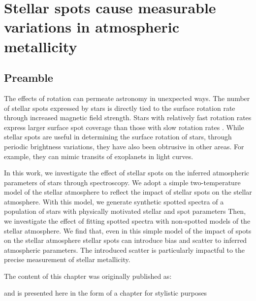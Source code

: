 
\chapter{Stellar spots cause measurable variations in atmospheric metallicity}
\label{chap:stellar_spots}

\section*{Preamble}

The effects of rotation can permeate astronomy in unexpected ways.
The number of stellar spots expressed by stars is directly tied to the surface rotation rate through increased magnetic field strength.
Stars with relatively fast rotation rates express larger surface spot coverage than those with slow rotation rates \citep{cao_starspots_2022}.
While stellar spots are useful in determining the surface rotation of stars, through periodic brightness variations, they have also been obtrusive in other areas.
For example, they can mimic transits of exoplanets in light curves.

In this work, we investigate the effect of stellar spots on the inferred atmospheric parameters of stars through spectroscopy.
We adopt a simple two-temperature model of the stellar atmosphere to reflect the impact of stellar spots on the stellar atmosphere.
With this model, we generate synthetic spotted spectra of a population of stars with physically motivated stellar and spot parameters
Then, we investigate the effect of fitting spotted spectra with non-spotted models of the stellar atmosphere.
We find that, even in this simple model of the impact of spots on the stellar atmosphere stellar spots can introduce bias and scatter to inferred atmospheric parameters.
The introduced scatter is particularly impactful to the precise measurement of stellar metallicity.


The content of this chapter was originally published as:
\begin{quote}
	\citet{tanner_ss}
\end{quote}
and is presented here in the form of a chapter for stylistic purposes 



\newpage








